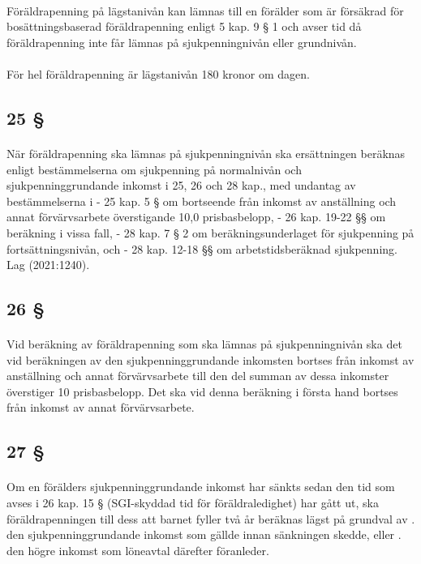 \documentclass[a4paper,notitlepage,openany,10pt]{book}
\begin{document}
\paragraph*{}
Föräldrapenning på lägstanivån kan lämnas till en förälder som är försäkrad för bosättningsbaserad föräldrapenning enligt 5 kap. 9 § 1 och avser tid då föräldrapenning inte får lämnas på sjukpenningnivån eller grundnivån.
\paragraph*{}
För hel föräldrapenning är lägstanivån 180 kronor om dagen.
\subsection*{25 §}
\paragraph*{}
När föräldrapenning ska lämnas på sjukpenningnivån ska ersättningen beräknas enligt bestämmelserna om sjukpenning på normalnivån och sjukpenninggrundande inkomst i 25, 26 och 28 kap., med undantag av bestämmelserna i
\newline - 25 kap. 5 § om bortseende från inkomst av anställning och annat förvärvsarbete överstigande 10,0 prisbasbelopp,
\newline - 26 kap. 19-22 §§ om beräkning i vissa fall,
\newline - 28 kap. 7 § 2 om beräkningsunderlaget för sjukpenning på fortsättningsnivån, och
\newline - 28 kap. 12-18 §§ om arbetstidsberäknad sjukpenning.
Lag (2021:1240).
\subsection*{26 §}
\paragraph*{}
Vid beräkning av föräldrapenning som ska lämnas på sjukpenningnivån ska det vid beräkningen av den sjukpenninggrundande inkomsten bortses från inkomst av anställning och annat förvärvsarbete till den del summan av dessa inkomster överstiger 10 prisbasbelopp. Det ska vid denna beräkning i första hand bortses från inkomst av annat förvärvsarbete.
\subsection*{27 §}
\paragraph*{}
Om en förälders sjukpenninggrundande inkomst har sänkts sedan den tid som avses i 26 kap. 15 § (SGI-skyddad tid för föräldraledighet) har gått ut, ska föräldrapenningen till dess att barnet fyller två år beräknas lägst på grundval av
. den sjukpenninggrundande inkomst som gällde innan sänkningen skedde, eller
. den högre inkomst som löneavtal därefter föranleder.
\end{document}
